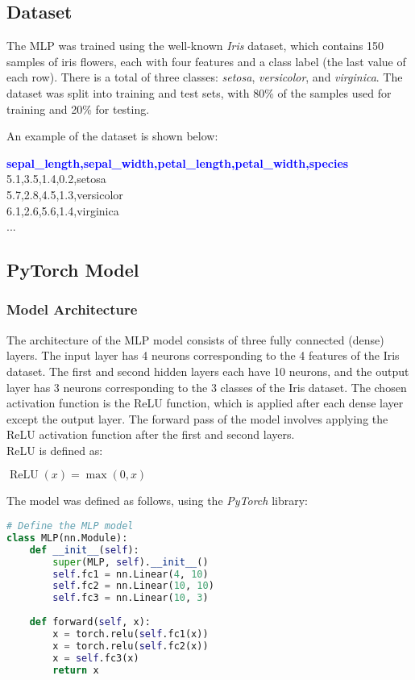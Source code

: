 \documentclass{article}
\begin{document}
\subsection{Dataset}
The MLP was trained using the well-known \textit{Iris} dataset, which contains 150 samples of iris flowers, each with four features and a class label (the last value of each row).
There is a total of three classes: \textit{setosa}, \textit{versicolor}, and \textit{virginica}.
The dataset was split into training and test sets, with 80\% of the samples used for training and 20\% for testing.

An example of the dataset is shown below:

\begin{tcolorbox}[colback=gray!5, colframe=black, rounded corners, boxrule=0.1mm]
\textbf{\textcolor{blue}{sepal\_length,sepal\_width,petal\_length,petal\_width,species}} \\
5.1,3.5,1.4,0.2,setosa \\
5.7,2.8,4.5,1.3,versicolor \\
6.1,2.6,5.6,1.4,virginica \\
...
\end{tcolorbox}

\subsection{PyTorch Model}
\subsubsection{Model Architecture}
The architecture of the MLP model consists of three fully connected (dense) layers.
The input layer has 4 neurons corresponding to the 4 features of the Iris dataset. 
The first and second hidden layers each have 10 neurons, and the output layer has 3 neurons corresponding to the 3 classes of the Iris dataset.
The chosen activation function is the ReLU function, which is applied after each dense layer except the output layer.
The forward pass of the model involves applying the ReLU activation function after the first and second layers.
\\ReLU is defined as:
\begin{center}
$\operatorname{ReLU}(x) = \max(0, x)$
\end{center}
The model was defined as follows, using the \textit{PyTorch} library:
\begin{lstlisting}[language=Python]
# Define the MLP model
class MLP(nn.Module):
    def __init__(self):
        super(MLP, self).__init__()
        self.fc1 = nn.Linear(4, 10)
        self.fc2 = nn.Linear(10, 10)
        self.fc3 = nn.Linear(10, 3)
    
    def forward(self, x):
        x = torch.relu(self.fc1(x))
        x = torch.relu(self.fc2(x))
        x = self.fc3(x)
        return x
\end{lstlisting}
\end{document}
